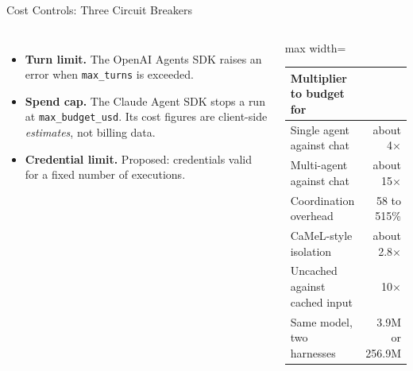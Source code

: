 \begin{frame}{Cost Controls: Three Circuit Breakers}
    \begin{columns}[T,onlytextwidth]
        \begin{itemize}\itemsep0.45em
            \item \textbf{Turn limit.} The OpenAI Agents SDK raises an error when \texttt{max\_turns} is exceeded.
            \item \textbf{Spend cap.} The Claude Agent SDK stops a run at \texttt{max\_budget\_usd}. Its cost figures are client-side \emph{estimates}, not billing data.
            \item \textbf{Credential limit.} Proposed: credentials valid for a fixed number of executions.
        \end{itemize}
        \centering
        \footnotesize
        \renewcommand{\arraystretch}{1.2}
        \begin{adjustbox}{max width=\linewidth}\begin{tabular}{>{\raggedright\arraybackslash}p{3.4cm}r}
            \toprule
            \textbf{Multiplier to budget for} & \\
            \midrule
            Single agent against chat & about 4$\times$ \\
            Multi-agent against chat & about 15$\times$ \\
            Coordination overhead & 58 to 515\% \\
            CaMeL-style isolation & about 2.8$\times$ \\
            Uncached against cached input & 10$\times$ \\
            Same model, two harnesses & 3.9M or 256.9M \\
            \bottomrule
        \end{tabular}\end{adjustbox}
    \end{columns}
    \vspace{0.4em}
\end{frame}

